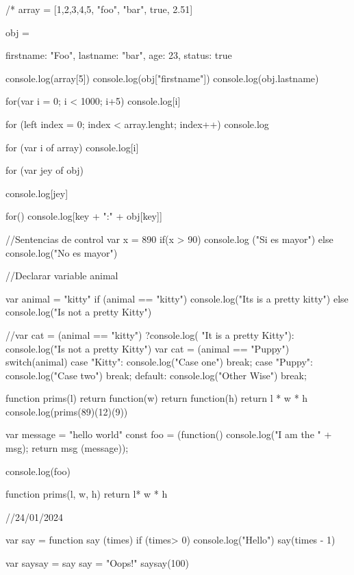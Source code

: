 /*
array = [1,2,3,4,5, "foo", "bar", true, 2.51]

obj = {
    firstname: "Foo",
    lastname: "bar",
    age: 23,
    status: true

}

console.log(array[5])
console.log(obj["firstname"])
console.log(obj.lastname)


for(var i = 0; i < 1000; i+5) {
    console.log[i]
}

for (left index = 0; index < array.lenght; index++){
    console.log
}


for (var i of array) {
    console.log[i]
}



for (var jey of obj) {

    console.log[jey]

}

for(){
    console.log[key + ":" + obj[key]]
}

//Sentencias de control
var x  = 890
if(x > 90){
console.log ("Si es mayor")
 }else{
    console.log("No es mayor")
 }

 //Declarar variable animal 

 var animal = "kitty"
if (animal == "kitty"){
    console.log("Its is a pretty kitty")
} else {
    console.log("Is not a pretty Kitty")
}

//var cat = (animal == "kitty") ?console.log( "It is a pretty Kitty"): console.log("Is not a pretty Kitty")
var cat = (animal == "Puppy")
switch(animal){
    case "Kitty":
        console.log("Case one")
        break;
        case "Puppy":
            console.log("Case two")
            break;
            default:
                console.log("Other Wise")
                break;
}




function prims(l){
    return function(w){
        return function(h){
            return l * w * h
        }
    }
}
        console.log(prims(89)(12)(9))


var message = "hello world"
const foo = (function(){
    console.log("I am the " + msg);
    return msg
}(message));

console.log(foo)


function prims(l, w, h){
    return l* w * h
}

//24/01/2024

var say = function say (times) {
    if (times> 0){
        console.log("Hello")
        say(times - 1)
    }
}

var saysay = say
say = "Oops!"
saysay(100)

